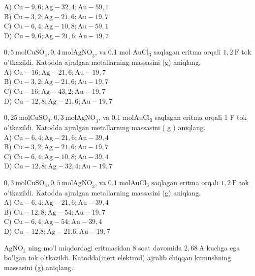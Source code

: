 A) $\mathrm{Cu}-9,6 ; \mathrm{Ag}-32,4 ; \mathrm{Au}-59,1$\\
B) $\mathrm{Cu}-3,2 ; \mathrm{Ag}-21,6 ; \mathrm{Au}-19,7$\\
C) $\mathrm{Cu}-6,4 ; \mathrm{Ag}-10,8 ; \mathrm{Au}-59,1$\\
D) $\mathrm{Cu}-9,6 ; \mathrm{Ag}-21,6 ; \mathrm{Au}-19,7$
  \item $0,5 \mathrm{~mol} \mathrm{CuSO}_{4}, 0,4 \mathrm{~mol} \mathrm{AgNO}_{3}$, va 0.1 mol $\mathrm{AuCl}_{3}$ saqlagan eritma orqali $1,2 \mathrm{~F}$ tok o'tkazildi. Katodda ajralgan metallarning massasini (g) aniqlang.\\
A) $\mathrm{Cu}-16 ; \mathrm{Ag}-21,6 ; \mathrm{Au}-19,7$\\
B) $\mathrm{Cu}-3,2 ; \mathrm{Ag}-21,6 ; \mathrm{Au}-19,7$\\
C) $\mathrm{Cu}-16 ; \mathrm{Ag}-43,2 ; \mathrm{Au}-19,7$\\
D) $\mathrm{Cu}-12,8 ; \mathrm{Ag}-21,6 ; \mathrm{Au}-19,7$
  \item $0,25 \mathrm{~mol} \mathrm{CuSO}_{4}, 0,3 \mathrm{~mol} \mathrm{AgNO}_{3}$, va 0.1 $\mathrm{mol} \mathrm{AuCl}_{3}$ saqlagan eritma orqali 1 F tok o'tkazildi. Katodda ajralgan metallarning massasini ( g ) aniqlang.\\
A) $\mathrm{Cu}-6,4 ; \mathrm{Ag}-21,6 ; \mathrm{Au}-39,4$\\
B) $\mathrm{Cu}-3,2 ; \mathrm{Ag}-21,6 ; \mathrm{Au}-19,7$\\
C) $\mathrm{Cu}-6,4 ; \mathrm{Ag}-10,8 ; \mathrm{Au}-39,4$\\
D) $\mathrm{Cu}-12,8 ; \mathrm{Ag}-32,4 ; \mathrm{Au}-19,7$
  \item $0,3 \mathrm{~mol} \mathrm{CuSO}_{4}, 0,5 \mathrm{~mol} \mathrm{AgNO}_{3}$, va 0.1 $\mathrm{mol} \mathrm{AuCl}_{3}$ saqlagan eritma orqali $1,2 \mathrm{~F}$ tok o'tkazildi. Katodda ajralgan metallarning massasini (g) aniqlang.\\
A) $\mathrm{Cu}-6,4 ; \mathrm{Ag}-21,6 ; \mathrm{Au}-39,4$\\
B) $\mathrm{Cu}-12,8 ; \mathrm{Ag}-54 ; \mathrm{Au}-19,7$\\
C) $\mathrm{Cu}-6,4 ; \mathrm{Ag}-54 ; \mathrm{Au}-39,4$\\
D) $\mathrm{Cu}-12.8 ; \mathrm{Ag}-21.6 ; \mathrm{Au}-19,7$
  \item $\mathrm{AgNO}_{3}$ ning mo'l miqdordagi eritmasidan 8 soat davomida $2,68 \mathrm{~A}$ kuchga ega bo'lgan tok o'tkazildi. Katodda(inert elektrod) ajralib chiqqan kumushning massasini (g) aniqlang.\\
